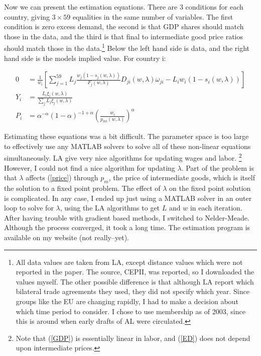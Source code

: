 \documentclass{article}
\begin{document}
Now we can present the estimation equations.  There are 3 conditions for each country, giving $3\times59$ equalities in the same number of variables.  The first condition is zero excess demand, the second is that GDP shares should match those in the data, and the third is that final to intermediate good price ratios should match those in the data.\footnote{All data values are taken from LA, except distance values which were not reported in the paper.  The source, CEPII, was reported, so I downloaded the values myself.  The other possible difference is that although LA report which bilateral trade agreements they used, they did not specify which year.  Since groups like the EU are changing rapidly, I had to make a decision about which time period to consider.  I chose to use membership as of 2003, since this is around when early drafts of AL were circulated.}  Below the left hand side is data, and the right hand side is the models implied value.  For country i:

\begin{align}
 0 &= \frac{1}{w_i}\left[\sum_{j=1}^{59} L_j \frac{w_j(1-s_j(w,\lambda))}{F_j(w,\lambda)}D_{ji}(w,\lambda)\omega_{ji} - L_i w_i (1-s_i(w,\lambda))\right] \label{ED}\\
 Y_i &= \frac{L_i \xi_i(w,\lambda)}{\sum_j L_j \xi_j(w,\lambda)} \label{GDP}\\
 P_i &= \alpha^{-\alpha}(1-\alpha)^{-1+\alpha}\left(\frac{w_i}{p_{mi}(w,\lambda)}\right)^\alpha \label{price}
\end{align}

Estimating these equations was a bit difficult.  The parameter space is too large to effectively use any MATLAB solvers to solve all of these non-linear equations simultaneously.  LA give very nice algorithms for updating wages and labor. \footnote{Note that (\ref{GDP}) is essentially linear in labor, and (\ref{ED}) does not depend upon intermediate prices.} However, I could not find a nice algorithm for updating $\lambda$.  Part of the problem is that $\lambda$ affects (\ref{price}) through $p_m$, the price of intermediate goods, which is itself the solution to a fixed point problem.  The effect of $\lambda$ on the fixed point solution is complicated.  In any case, I ended up just using a MATLAB solver in an outer loop to solve for $\lambda$, using the LA algorithms to get $L$ and $w$ in each iteration.  After having trouble with gradient based methods, I switched to Nelder-Meade.  Although the process converged, it took a long time.  The estimation program is available on my website (not really--yet). 
\end{document}
